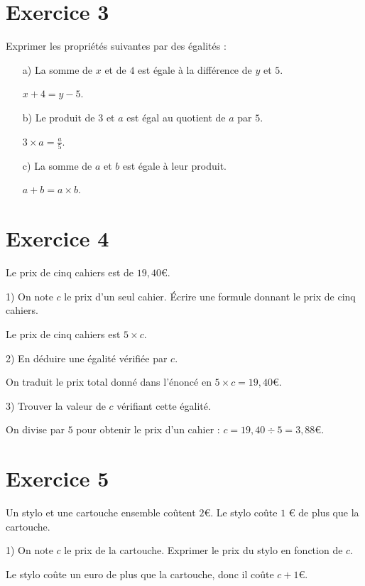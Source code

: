 \documentclass[12 pt]{article}
\theoremstyle{plain}
\newcounter{n}
\numberwithin{n}{section}
\begin{document}
\section{Exercice 3}

Exprimer les propriétés suivantes par des égalités :

\begin{itemize}
\item[a) ] La somme de $x$ et de $4$ est égale à la différence de $y$ et $5$. 

$x+4 = y-5$.
\item[b)] Le produit de $3$ et $a$ est égal au quotient de $a$ par $5$. 

$3\times a = \frac{a}5$.
\item[c)] La somme de $a$ et $b$ est égale à leur produit. 

$a+b = a\times b$.
\end{itemize}



\section{Exercice 4}

Le prix de cinq cahiers est de $19,40$\euro . 

1) On note $c$ le prix d'un seul cahier. Écrire une formule donnant le prix de cinq cahiers. 

Le prix de cinq cahiers est $5\times c$.

2) En déduire une égalité vérifiée par $c$. 

On traduit le prix total donné dans l'énoncé en $5\times c = 19,40$\euro.

3) Trouver la valeur de $c$ vérifiant cette égalité. 

On divise par $5$ pour obtenir le prix d'un cahier : $c=19,40\div5= 3,88$\euro.



\section{Exercice 5}

Un stylo et une cartouche ensemble coûtent $2$\euro{}. 
Le stylo coûte $1$ \euro{} de plus que la cartouche.

1) On note $c$ le prix de la cartouche. Exprimer le prix du stylo en fonction de $c$. 

Le stylo coûte un euro de plus que la cartouche, donc il coûte $c+1$\euro.
\end{document}
